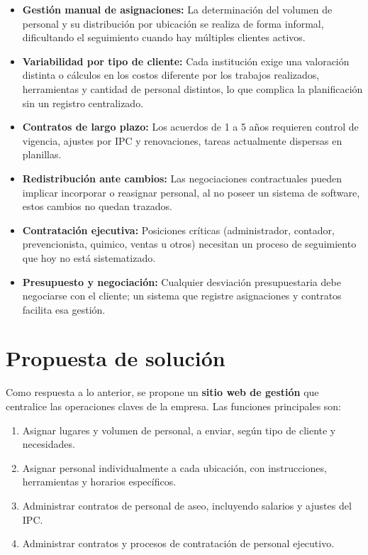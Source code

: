 \documentclass[12pt,a4paper]{report}
\begin{document}
\begin{itemize}
  \item \textbf{Gestión manual de asignaciones:} La determinación del volumen de personal y su distribución por ubicación se realiza de forma informal, dificultando el seguimiento cuando hay múltiples clientes activos.
  \item \textbf{Variabilidad por tipo de cliente:} Cada institución exige una valoración distinta o cálculos en los costos diferente por los trabajos realizados, herramientas y cantidad de personal distintos, lo que complica la planificación sin un registro centralizado.
  \item \textbf{Contratos de largo plazo:} Los acuerdos de 1 a 5 años requieren control de vigencia, ajustes por IPC y renovaciones, tareas actualmente dispersas en planillas.
  \item \textbf{Redistribución ante cambios:} Las negociaciones contractuales pueden implicar incorporar o reasignar personal, al no poseer un sistema de software, estos cambios no quedan trazados.
  \item \textbf{Contratación ejecutiva:} Posiciones críticas (administrador, contador, prevencionista, quimico, ventas u otros) necesitan un proceso de seguimiento que hoy no está sistematizado.
  \item \textbf{Presupuesto y negociación:} Cualquier desviación presupuestaria debe negociarse con el cliente; un sistema que registre asignaciones y contratos facilita esa gestión.
\end{itemize}

\section{Propuesta de solución}

Como respuesta a lo anterior, se propone un \textbf{sitio web de gestión} que centralice las operaciones claves de la empresa. Las funciones principales son:

\begin{enumerate}
  \item Asignar lugares y volumen de personal, a enviar, según tipo de cliente y necesidades.
  \item Asignar personal individualmente a cada ubicación, con instrucciones, herramientas y horarios específicos.
  \item Administrar contratos de personal de aseo, incluyendo salarios y ajustes del IPC.
  \item Administrar contratos y procesos de contratación de personal ejecutivo.
\end{enumerate}
\end{document}
